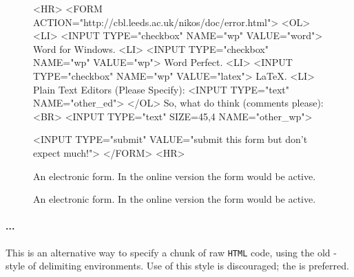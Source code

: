 \begin{htmlonly}
\begin{figure}[h]
\begin{makeimage}
\end{makeimage}
\begin{rawhtml}
<HR>
<FORM ACTION="http://cbl.leeds.ac.uk/nikos/doc/error.html">
<OL>
<LI> <INPUT TYPE="checkbox" NAME="wp" VALUE="word"> Word for
Windows.
<LI> <INPUT TYPE="checkbox" NAME="wp" VALUE="wp"> Word Perfect.
<LI> <INPUT TYPE="checkbox" NAME="wp" VALUE="latex"> LaTeX.
<LI> Plain Text Editors (Please Specify): <INPUT TYPE="text" NAME="other_ed">
</OL>
So, what do think (comments please): <BR>
<INPUT TYPE="text" SIZE=45,4 NAME="other_wp">

<INPUT TYPE="submit" VALUE="submit this form but don't expect much!">
</FORM>
<HR>
\end{rawhtml}
\caption{An electronic form. 
 In the online version the form would be active.}\label{fig_eform}
\end{figure}
\end{htmlonly}
%
\begin{latexonly}
\begin{figure}[h]
    \begin{center}
    \end{center}
  \caption{An electronic form.
  In the online version the form would be active.}
  \label{fig_eform}
\end{figure}
\end{latexonly}



%
\paragraph*{...\label{endrawhtml}}
\begin{changebar}
This is an alternative way to specify a chunk of raw \texttt{HTML} code,
using the old \AmS-style of delimiting environments.
Use of this style is discouraged; 
the   is preferred.%
\end{changebar}%

